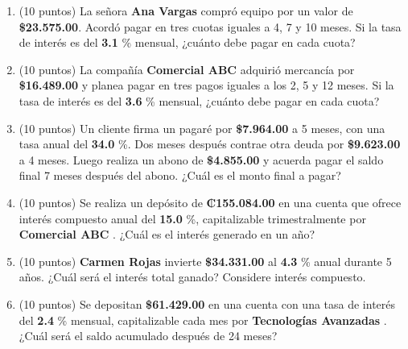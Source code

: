 \documentclass[10pt]{article}
\begin{document}
\begin{enumerate}[leftmargin=*, label=\textbf{\arabic*.}]
  \item (10 puntos) La señora \textbf{ Ana Vargas } compró equipo por un valor de \textbf{\$\num{ 23,575.00 }}. Acordó pagar en tres cuotas iguales a 4, 7 y 10 meses. Si la tasa de interés es del \textbf{ 3.1 }\% mensual, ¿cuánto debe pagar en cada cuota?

  \vspace{0.5cm}

  \item (10 puntos) La compañía \textbf{ Comercial ABC } adquirió mercancía por \textbf{\$\num{ 16,489.00 }} y planea pagar en tres pagos iguales a los 2, 5 y 12 meses. Si la tasa de interés es del \textbf{ 3.6 }\% mensual, ¿cuánto debe pagar en cada cuota?

  \vspace{0.5cm}

  \item (10 puntos) Un cliente firma un pagaré por \textbf{\$\num{ 7,964.00 }} a 5 meses, con una tasa anual del \textbf{ 34.0 }\%. Dos meses después contrae otra deuda por \textbf{\$\num{ 9,623.00 }} a 4 meses. Luego realiza un abono de \textbf{\$\num{ 4,855.00 }} y acuerda pagar el saldo final 7 meses después del abono. ¿Cuál es el monto final a pagar?

  \vspace{0.5cm}

  \item (10 puntos) Se realiza un depósito de \textbf{₡\num{ 155.084.00 }} en una cuenta que ofrece interés compuesto anual del \textbf{ 15.0 }\%, capitalizable trimestralmente por \textbf{ Comercial ABC }. ¿Cuál es el interés generado en un año?

  \vspace{0.5cm}

  \item (10 puntos) \textbf{ Carmen Rojas } invierte \textbf{\$\num{ 34,331.00 }} al \textbf{ 4.3 }\% anual durante 5 años. ¿Cuál será el interés total ganado? Considere interés compuesto.

  \vspace{0.5cm}

  \item (10 puntos) Se depositan \textbf{\$\num{ 61,429.00 }} en una cuenta con una tasa de interés del \textbf{ 2.4 }\% mensual, capitalizable cada mes por \textbf{ Tecnologías Avanzadas }. ¿Cuál será el saldo acumulado después de 24 meses?
\end{enumerate}
\end{document}
